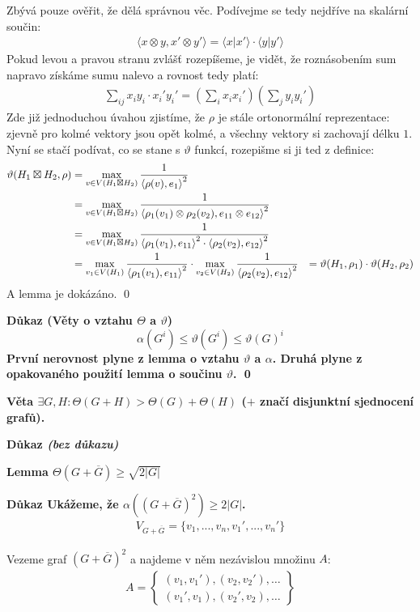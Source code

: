 \documentclass[a4paper,12pt,titlepage]{article}
\newcommand{\shn}{\Theta}
\newcommand{\lm}{\smallskip\noindent\bf Lemma\rm{} }
\newcommand{\dk}{\smallskip\noindent\bf Důkaz\rm{} }
\newcommand{\vt}{\smallskip\noindent\bf Věta\rm{} }
\newcommand{\sk}[1]{{\langle #1\rangle}}
\begin{document}
Zbývá pouze ověřit, že dělá správnou věc. Podívejme se tedy nejdříve na skalární 
součin:
\begin{align}
	\sk{x \otimes y , x' \otimes y'} = \sk{x | x'} \cdot \sk{y | y'}
\end{align}
Pokud levou a pravou stranu zvlášť rozepíšeme, je vidět, že roznásobením sum 
napravo získáme sumu nalevo a rovnost tedy platí:
\begin{align}
	\sum_{ij} x_iy_i \cdot x_i' y_i' = \left( \sum_i x_ix_i'\right) \left(\sum_j 
	y_iy_i' \right)
\end{align}
Zde již jednoduchou úvahou zjistíme, že $\rho$ je stále ortonormální 
reprezentace: zjevně pro kolmé vektory jsou opět kolmé, a všechny vektory si 
zachovají délku $1$. Nyní se stačí podívat, co se stane s $\vartheta$ funkcí, 
rozepišme si ji ted z definice:
\begin{align*}
	\vartheta(H_1 \boxtimes H_2, \rho) &= \max_{v\in V(H_1 \boxtimes H_2)} { 1 
	\over \sk{\rho(v) , e_1}^2} \\
	&= \max_{v\in V(H_1 \boxtimes H_2)} { 1 \over \sk{\rho_1(v_1)\otimes \rho_2(v_2) , e_{11} \otimes e_{12}}^2} \\
	&= \max_{v\in V(H_1 \boxtimes H_2)} { 1 \over \sk{\rho_1(v_1) , e_{11}}^2
		\cdot \sk{\rho_2(v_2) , e_{12}}^2} \\
	&= \max_{v_1\in V(H_1)} { 1 \over \sk{\rho_1(v_1) , e_{11}}^2} \cdot
	  \max_{v_2\in V(H_2)} { 1 \over \sk{\rho_2(v_2) , e_{12}}^2} 
	&= \vartheta(H_1,\rho_1) \cdot \vartheta(H_2, \rho_2)
\end{align*}
A lemma je dokázáno. \qed


\dk (Věty o vztahu $\Theta$ a $\vartheta$)  $$\alpha(G^i) \le \vartheta(G^i) \le \vartheta(G)^i$$
První nerovnost plyne z lemma o vztahu $\vartheta$ a $\alpha$. Druhá plyne z
opakovaného použití lemma o součinu $\vartheta$.
\qed

\vt $\exists G,H: \shn(G+H) > \shn(G) + \shn(H)$ ($+$ značí disjunktní sjednocení grafů).

\dk {\it (bez důkazu)}

\lm $\shn(G + \overline{G}) \ge \sqrt{2|G|}$

\dk Ukážeme, že $\alpha ((G+\overline G)^2) \geq 2|G|$.
\begin{align*}
	V_{G+\overline G} = \{ v_1, ..., v_n, v_1', ..., v_n'\}
\end{align*}

Vezeme graf $(G+\overline G)^2$ a najdeme v něm nezávislou množinu $A$:
\begin{align*}
	A = \left\{\begin{matrix}
		(v_1, v_1'), (v_2, v_2'), \dots \\
		(v_1', v_1), (v_2', v_2), \dots
		\end{matrix}\right\}
\end{align*}
\end{document}
